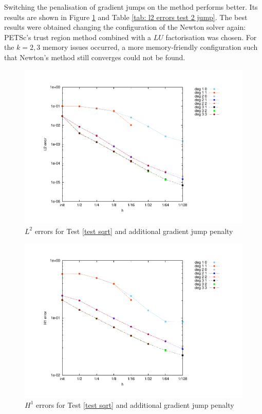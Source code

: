 Switching the penalisation of gradient jumps on the method performs better. Its results are shown in Figure \ref{fig: l2 errors test 2 jump} and Table \ref{tab: l2 errors test 2 jump}. The best results were obtained changing the configuration of the Newton solver again: PETSc's trust region method combined with a $LU$ factorisation was chosen. For the $k=2,3$ memory issues occurred, a more memory-friendly configuration such that Newton's method still converges could not be found. %

\begin{figure}[H]
	\centering
	\includegraphics[scale =0.4]{plots/MA2_Neilan_GradJump_l2.pdf}
	\caption{$L^2$ errors for Test \ref{test sqrt}  and additional gradient jump penalty}
	\label{fig: l2 errors test 2 jump}
\end{figure}
\begin{figure}[H]
	\centering
	\includegraphics[scale =0.4]{plots/MA2_Neilan_GradJump_h1.pdf}
	\caption{$H^1$ errors for Test \ref{test sqrt}  and additional gradient jump penalty}
	\label{fig: h1 errors test 2 jump}
\end{figure}
